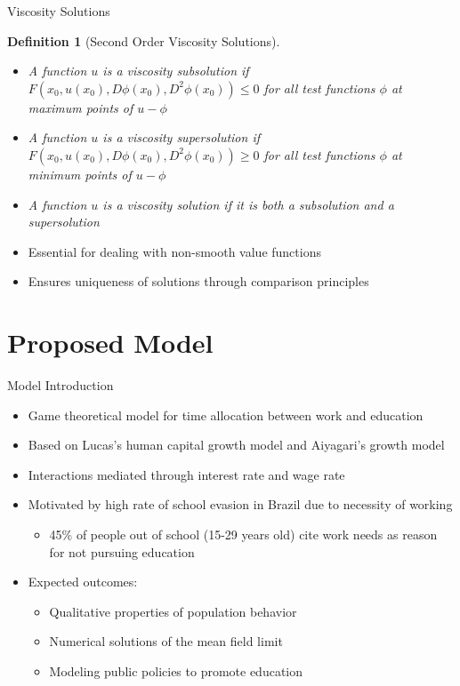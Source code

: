 \documentclass{beamer}
\newtheorem{definition}{Definition}
\begin{document}
\begin{frame}{Viscosity Solutions}
\begin{definition}[Second Order Viscosity Solutions]
    \begin{itemize}
        \item A function $u$ is a viscosity subsolution if
        $F(x_0, u(x_0), D \phi(x_0), D^2 \phi(x_0)) \leq 0$
        for all test functions $\phi$ at maximum points of $u - \phi$
        
        \item A function $u$ is a viscosity supersolution if
        $F(x_0, u(x_0), D\phi(x_0), D^2 \phi(x_0)) \geq 0$
        for all test functions $\phi$ at minimum points of $u - \phi$
        
        \item A function $u$ is a viscosity solution if it is both a subsolution and a supersolution
    \end{itemize}
\end{definition}

\begin{itemize}
    \item Essential for dealing with non-smooth value functions
    \item Ensures uniqueness of solutions through comparison principles
\end{itemize}
\end{frame}

\section{Proposed Model}

\begin{frame}{Model Introduction}
\begin{itemize}
    \item Game theoretical model for time allocation between work and education
    \item Based on Lucas's human capital growth model and Aiyagari's growth model
    \item Interactions mediated through interest rate and wage rate
    \item Motivated by high rate of school evasion in Brazil due to necessity of working
    \begin{itemize}
        \item 45\% of people out of school (15-29 years old) cite work needs as reason for not pursuing education
    \end{itemize}
    \item Expected outcomes:
    \begin{itemize}
        \item Qualitative properties of population behavior
        \item Numerical solutions of the mean field limit
        \item Modeling public policies to promote education
    \end{itemize}
\end{itemize}
\end{frame}
\end{document}
